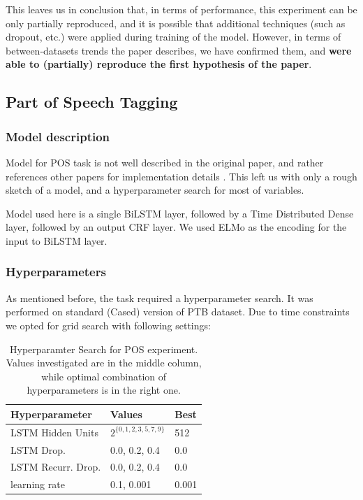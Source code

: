 \documentclass[11pt,a4paper]{article}
\begin{document}
    This leaves us in conclusion that, in terms of performance, this experiment can be only partially reproduced, and it is possible that additional techniques (such as dropout, etc.) were applied during training of the model. However, in terms of between-datasets trends the paper describes, we have confirmed them, and \textbf{were able to (partially) reproduce the first hypothesis of the paper}.

\subsection{Part of Speech Tagging}
\label{sec:exp-pos}

    \subsubsection{Model description}
    Model for POS task is not well described in the original paper, and rather references other papers for implementation details \cite{ma-hovy-2016-end}. This left us with only a rough sketch of a model, and a hyperparameter search for most of variables.

    Model used here is a single BiLSTM layer, followed by a Time Distributed Dense layer, followed by an output CRF layer. We used ELMo as the encoding for the input to BiLSTM layer.

    \subsubsection{Hyperparameters}
    \label{sec:exp-pos-hyper}
    As mentioned before, the task required a hyperparameter search. It was performed on standard (Cased) version of PTB dataset. Due to time constraints we opted for grid search with following settings:
    \begin{table}[h]
        \centering
        \begin{tabular}{|l|l|l|}
            \hline
            Hyperparameter & Values & Best \\
            \hline
            LSTM Hidden Units & $2^{\{0, 1, 2, 3, 5, 7, 9\}}$ & 512 \\
            \hline
            LSTM Drop. & 0.0, 0.2, 0.4 & 0.0 \\
            \hline
            LSTM Recurr. Drop. & 0.0, 0.2, 0.4 & 0.0 \\
            \hline
            learning rate & 0.1, 0.001 & 0.001 \\
            \hline
        \end{tabular}
        \caption{Hyperparamter Search for POS experiment. Values investigated are in the middle column, while optimal combination of hyperparameters is in the right one.}
        \label{tab:pos-hypersearch}
    \end{table}
\end{document}
